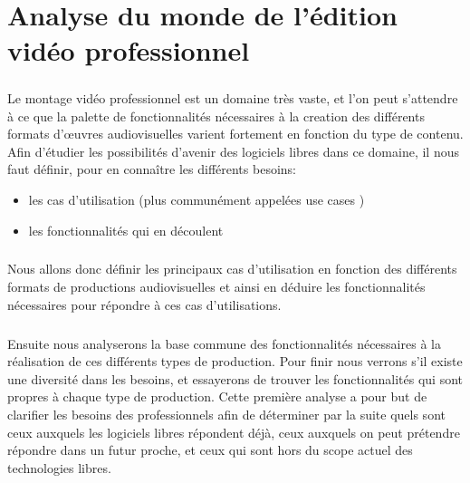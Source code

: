 \chapter {Analyse du monde de l'édition vidéo professionnel}

\minitoc \mtcskip \newpage


\paragraph{}



Le montage vidéo professionnel est un domaine très vaste, et l'on
peut s'attendre à ce que la palette de fonctionnalités nécessaires
à la creation des différents formats d'œuvres audiovisuelles
varient fortement en fonction du type de contenu. Afin d'étudier les
possibilités d'avenir des logiciels libres dans ce domaine, il nous
faut définir, pour en connaître les différents besoins:

\begin{itemize} \setlength{\itemsep}{2mm}

  \item {les cas d'utilisation (plus communément appelées use cases
    )} 

  \item {les fonctionnalités qui en découlent}

\end{itemize}


\paragraph{}

Nous allons donc définir les principaux cas d'utilisation en fonction des
différents formats de productions audiovisuelles et ainsi en déduire les
fonctionnalités nécessaires pour répondre à ces cas d'utilisations.

\paragraph{}

Ensuite nous analyserons la base commune des fonctionnalités nécessaires
à la réalisation de ces différents types de production.  Pour finir
nous verrons s'il existe une diversité dans les besoins, et essayerons
de trouver les fonctionnalités qui sont propres à chaque type de
production. Cette première analyse a pour but de clarifier les besoins
des professionnels afin de déterminer par la suite quels sont ceux
auxquels les logiciels libres répondent déjà, ceux auxquels on peut
prétendre répondre dans un futur proche, et ceux qui sont hors du
scope actuel des technologies libres.

